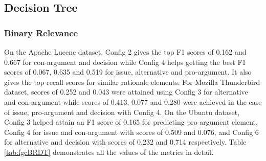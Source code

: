 \documentclass[a4paper,12pt,twoside]{report}
\begin{document}
\subsection{Decision Tree}

\subsubsection{Binary Relevance}
On the Apache Lucene dataset, Config 2 gives the top F1 scores of 0.162 and 0.667 for con-argument and decision while Config 4 helps getting the best F1 scores of 0.067, 0.635 and 0.519 for issue, alternative and pro-argument. It also gives the top recall scores for similar rationale elements. For Mozilla Thunderbird dataset, scores of 0.252 and 0.043 were attained using Config 3 for alternative and con-argument while scores of 0.413, 0.077 and 0.280 were achieved in the case of issue, pro-argument and decision with Config 4. On the Ubuntu dataset, Config 3 helped attain an F1 score of 0.165 for predicting pro-argument element, Config 4 for issue and con-argument with scores of 0.509 and 0.076, and Config 6 for alternative and decision with scores of 0.232 and 0.714 respectively. Table \ref{tab:fgcBRDT} demonstrates all the values of the metrics in detail.
\end{document}
